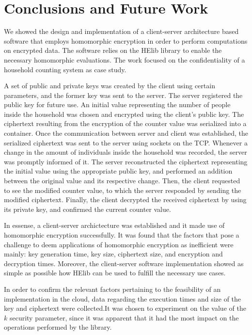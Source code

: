 \chapter{Conclusions and Future Work}
\label{conclusions}

We showed the design and implementation of a client-server architecture based software that employs homomorphic encryption in order to perform computations on encrypted data. The software relies on the HElib library to enable the necessary homomorphic evaluations. The work focused on the confidentiality of a household counting system as case study. 

A set of public and private keys was created by the client using certain parameters, and the former key was sent to the server. The server registered the public key for future use. An initial value representing the number of people inside the household was chosen and encrypted using the client's public key. The ciphertext resulting from the encryption of the counter value was serialized into a container. Once the communication between server and client was established, the serialized ciphertext was sent to the server using sockets on the TCP. Whenever a change in the amount of individuals inside the household was recorded, the server was promptly informed of it. The server reconstructed the ciphertext representing the initial value using the appropriate public key, and performed an addition between the original value and its respective change. Then, the client requested to see the modified counter value, to which the server responded by sending the modified ciphertext. Finally, the client decrypted the received ciphertext by using its private key, and confirmed the current counter value. 

In essense, a client-server archictecture was established and it made use of homomorphic encryption successfully. It was found that the factors that pose a challenge to deem applications of homomorphic encryption as inefficient were mainly: key generation time, key size, ciphertext size, and encryption and decryption times. Moreover, the client-server software implementation showed as simple as possible how HElib can be used to fulfill the necessary use cases. 

In order to confirm the relevant factors pertaining to the feasibility of an implementation in the cloud, data regarding the execution times and size of the key and ciphertext were collected.It was chosen to experiment on the value of the $k$ security parameter, since it was apparent that it had the most impact on the operations performed by the library. 

